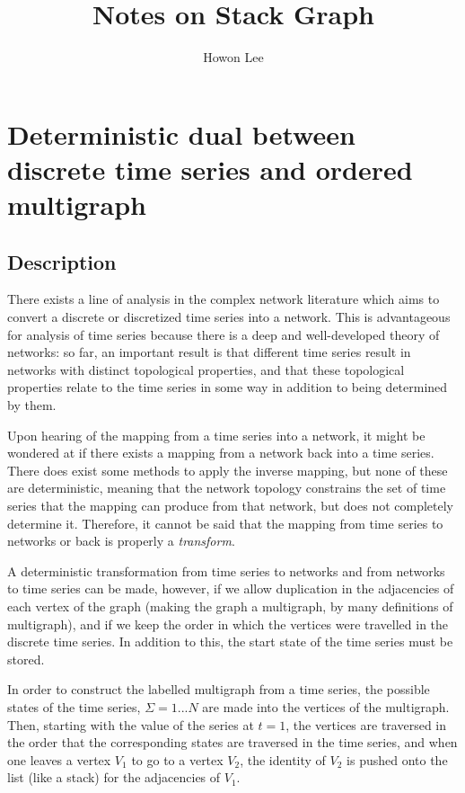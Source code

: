 \documentclass[12pt]{article}
\begin{document}
\title{Notes on Stack Graph}
\author{Howon Lee}
\maketitle

\section{Deterministic dual between discrete time series and ordered multigraph}

\subsection{Description}

There exists a line of analysis in the complex network literature which aims to convert a discrete or discretized time series into a network. This is advantageous for analysis of time series because there is a deep and well-developed theory of networks: so far, an important result is that different time series result in networks with distinct topological properties, and that these topological properties relate to the time series in some way in addition to being determined by them\cite{campanharo}.

Upon hearing of the mapping from a time series into a network, it might be wondered at if there exists a mapping from a network back into a time series. There does exist some methods to apply the inverse mapping, but none of these are deterministic, meaning that the network topology constrains the set of time series that the mapping can produce from that network, but does not completely determine it\cite{campanharo}. Therefore, it cannot be said that the mapping from time series to networks or back is properly a \emph{transform}.

A deterministic transformation from time series to networks and from networks to time series can be made, however, if we allow duplication in the adjacencies of each vertex of the graph (making the graph a multigraph, by many definitions of multigraph\cite{multigraph}), and if we keep the order in which the vertices were travelled in the discrete time series. In addition to this, the start state of the time series must be stored.

In order to construct the labelled multigraph from a time series, the possible states of the time series, $\Sigma = {1 ... N}$ are made into the vertices of the multigraph. Then, starting with the value of the series at $t =1$, the vertices are traversed in the order that the corresponding states are traversed in the time series, and when one leaves a vertex $V_1$ to go to a vertex $V_2$, the identity of $V_2$ is pushed onto the list (like a stack) for the adjacencies of $V_1$.
\end{document}
